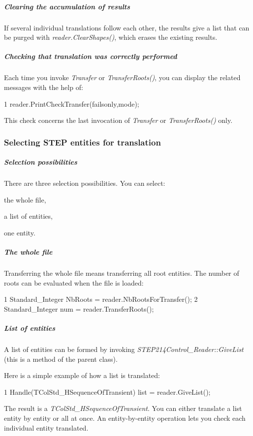 \subparagraph*{Clearing the accumulation of results}

If several individual translations follow each other, the results give a list that can be purged with {\itshape reader.\+Clear\+Shapes()}, which erases the existing results.

\subparagraph*{Checking that translation was correctly performed}

Each time you invoke {\itshape Transfer} or {\itshape Transfer\+Roots()}, you can display the related messages with the help of\+: 
\begin{DoxyCode}
1 reader.PrintCheckTransfer(failsonly,mode); 
\end{DoxyCode}


This check concerns the last invocation of {\itshape Transfer} or {\itshape Transfer\+Roots()} only.\hypertarget{occt_user_guides__step_occt_step_2_3_6}{}\subsubsection{Selecting S\+T\+E\+P entities for translation}\label{occt_user_guides__step_occt_step_2_3_6}
\subparagraph*{Selection possibilities}

There are three selection possibilities. You can select\+:
\begin{DoxyItemize}
\item the whole file,
\item a list of entities,
\item one entity.
\end{DoxyItemize}

\subparagraph*{The whole file}

Transferring the whole file means transferring all root entities. The number of roots can be evaluated when the file is loaded\+: 
\begin{DoxyCode}
1 Standard\_Integer NbRoots = reader.NbRootsForTransfer(); 
2 Standard\_Integer num = reader.TransferRoots(); 
\end{DoxyCode}


\subparagraph*{List of entities}

A list of entities can be formed by invoking {\itshape S\+T\+E\+P214\+Control\+\_\+\+Reader\+::\+Give\+List} (this is a method of the parent class).

Here is a simple example of how a list is translated\+: 
\begin{DoxyCode}
1 Handle(TColStd\_HSequenceOfTransient) list = reader.GiveList(); 
\end{DoxyCode}
 The result is a {\itshape T\+Col\+Std\+\_\+\+H\+Sequence\+Of\+Transient}. You can either translate a list entity by entity or all at once. An entity-\/by-\/entity operation lets you check each individual entity translated.

